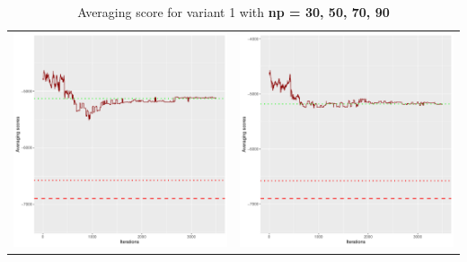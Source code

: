 \documentclass[]{scrartcl}
\begin{document}
\begin{table}[h!]
\begin{tabular}{cc}
\includegraphics[scale = 0.4]{./figs/alarm/v1/70/avgBoundsEvolution-3502.pdf} & 
\includegraphics[scale = 0.4]{./figs/alarm/v1/90/avgBoundsEvolution-3502.pdf} \\
\end{tabular}
\caption{Averaging score for variant 1 with \textbf{np =  30, 50, 70, 90 }}
\end{table}
\end{document}
